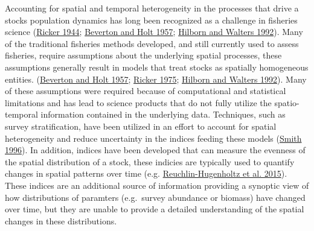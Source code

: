 \documentclass[
]{article}
\begin{document}
Accounting for spatial and temporal heterogeneity in the processes that drive a stocks population dynamics has long been recognized as a challenge in fisheries science (\protect\hyperlink{ref-rickerFurtherNotesFishing1944}{Ricker 1944}; \protect\hyperlink{ref-bevertonDynamicsExploitedFish1957}{Beverton and Holt 1957}; \protect\hyperlink{ref-hilbornQuantitativeFisheriesStock1992}{Hilborn and Walters 1992}). Many of the traditional fisheries methods developed, and still currently used to assess fisheries, require assumptions about the underlying spatial processes, these assumptions generally result in models that treat stocks as spatially homogeneous entities. (\protect\hyperlink{ref-bevertonDynamicsExploitedFish1957}{Beverton and Holt 1957}; \protect\hyperlink{ref-rickerComputationInterpretationBiological1975}{Ricker 1975}; \protect\hyperlink{ref-hilbornQuantitativeFisheriesStock1992}{Hilborn and Walters 1992}). Many of these assumptions were required because of computational and statistical limitations and has lead to science products that do not fully utilize the spatio-temporal information contained in the underlying data. Techniques, such as survey stratification, have been utilized in an effort to account for spatial heterogeneity and reduce uncertainty in the indices feeding these models (\protect\hyperlink{ref-smithAnalysisDataBottom1996}{Smith 1996}). In addition, indices have been developed that can measure the evenness of the spatial distribution of a stock, these indicies are typically used to quantify changes in spatial patterns over time (e.g. \protect\hyperlink{ref-reuchlin-hugenholtzPotentialSpatialDistribution2015}{Reuchlin-Hugenholtz et al. 2015}). These indices are an additional source of information providing a synoptic view of how distributions of paramters (e.g.~survey abundance or biomass) have changed over time, but they are unable to provide a detailed understanding of the spatial changes in these distributions.
\end{document}
